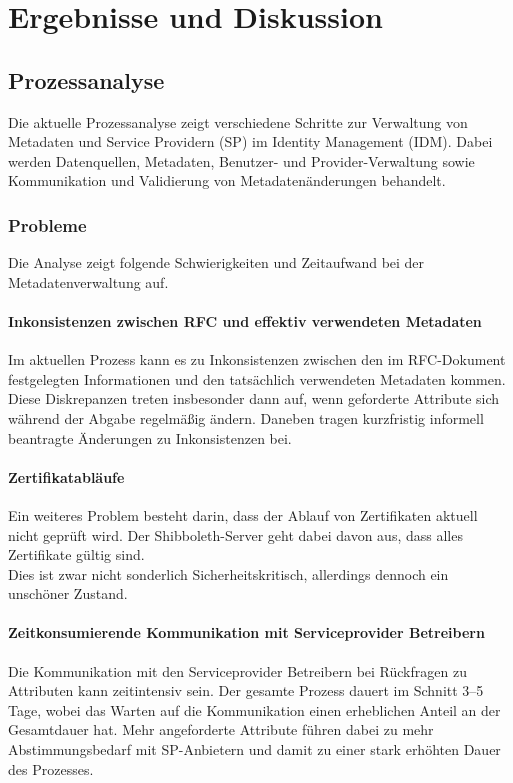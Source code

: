 
\section{Ergebnisse und Diskussion}\label{sec:results}

\subsection{Prozessanalyse}\label{subsec:prozessanalyse-results}
Die aktuelle Prozessanalyse zeigt verschiedene Schritte zur Verwaltung von Metadaten und Service Providern (SP) im Identity Management (IDM). 
Dabei werden Datenquellen, Metadaten, Benutzer- und Provider-Verwaltung sowie Kommunikation und Validierung von Metadatenänderungen behandelt.

\subsubsection{Probleme}
Die Analyse zeigt folgende Schwierigkeiten und Zeitaufwand bei der Metadatenverwaltung auf.


\paragraph{Inkonsistenzen zwischen RFC und effektiv verwendeten Metadaten}
Im aktuellen Prozess kann es zu Inkonsistenzen zwischen den im RFC-Dokument festgelegten Informationen und den tatsächlich verwendeten Metadaten kommen. 
Diese Diskrepanzen treten insbesonder dann auf, wenn geforderte Attribute sich während der Abgabe regelmäßig ändern.
Daneben tragen kurzfristig informell beantragte Änderungen zu Inkonsistenzen bei.

\paragraph{Zertifikatabläufe}
Ein weiteres Problem besteht darin, dass der Ablauf von Zertifikaten aktuell nicht geprüft wird. Der Shibboleth-Server geht dabei davon aus, dass alles Zertifikate gültig sind.\\
Dies ist zwar nicht sonderlich Sicherheitskritisch, allerdings dennoch ein unschöner Zustand.

\paragraph{Zeitkonsumierende Kommunikation mit Serviceprovider Betreibern}
Die Kommunikation mit den Serviceprovider Betreibern bei Rückfragen zu Attributen kann zeitintensiv sein.
Der gesamte Prozess dauert im Schnitt 3--5 Tage, wobei das Warten auf die Kommunikation einen erheblichen Anteil an der Gesamtdauer hat.
Mehr angeforderte Attribute führen dabei zu mehr Abstimmungsbedarf mit SP-Anbietern und damit zu einer stark erhöhten Dauer des Prozesses.

